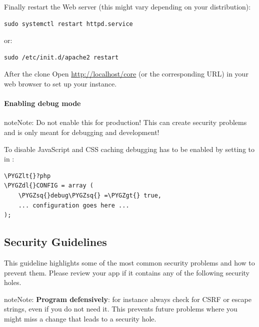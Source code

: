 \documentclass[letterpaper,10pt,english]{sphinxmanual}
\def\PYGZlt{\char`\<}
\def\PYGZgt{\char`\>}
\def\PYGZdl{\char`\$}
\def\PYGZsq{\char`\'}
\renewcommand\PYGZsq{\textquotesingle}
\begin{document}
Finally restart the Web server (this might vary depending on your distribution):

\begin{Verbatim}[commandchars=\\\{\}]
sudo systemctl restart httpd.service
\end{Verbatim}

or:

\begin{Verbatim}[commandchars=\\\{\}]
sudo /etc/init.d/apache2 restart
\end{Verbatim}

After the clone Open \href{http://localhost/core}{http://localhost/core} (or the corresponding URL) in your web browser to set up your instance.


\paragraph{Enabling debug mode}
\label{general/devenv:enabling-debug-mode}\label{general/devenv:debugmode}
\begin{notice}{note}{Note:}
Do not enable this for production! This can create security problems and is only meant for debugging and development!
\end{notice}

To disable JavaScript and CSS caching debugging has to be enabled by setting  to  in :

\begin{Verbatim}[commandchars=\\\{\}]
\PYGZlt{}?php
\PYGZdl{}CONFIG = array (
    \PYGZsq{}debug\PYGZsq{} =\PYGZgt{} true,
    ... configuration goes here ...
);
\end{Verbatim}


\subsection{Security Guidelines}
\label{general/security::doc}\label{general/security:github-help-page}\label{general/security:security-guidelines}
This guideline highlights some of the most common security problems and how to prevent them. Please review your app if it contains any of the following security holes.

\begin{notice}{note}{Note:}
\textbf{Program defensively}: for instance always check for CSRF or escape strings, even if you do not need it. This prevents future problems where you might miss a change that leads to a security hole.
\end{notice}
\end{document}
